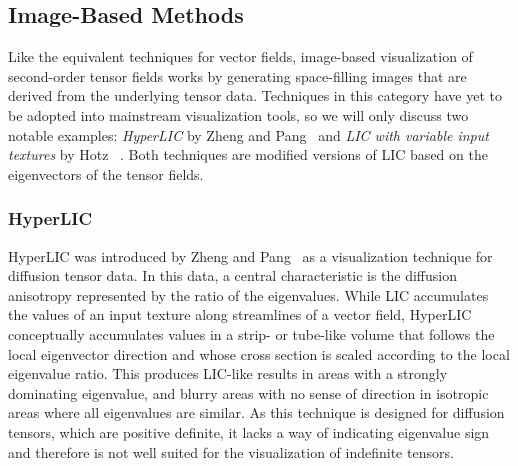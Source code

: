 \subsection{Image-Based Methods} %
\label{sub:tensor_image_based}
%
Like the equivalent techniques for vector fields, image-based visualization of
second-order tensor fields works by generating space-filling images that are
derived from the underlying tensor data.
%
Techniques in this category have yet to be adopted into mainstream visualization
tools, so we will only discuss two notable examples: \emph{HyperLIC} by Zheng
and Pang~\cite{Zheng2003} and \emph{LIC with variable input textures} by Hotz
\etal~\cite{Hotz2004}.
%
Both techniques are modified versions of \ac{LIC} based on the eigenvectors of
the tensor fields.
%

\subsubsection{HyperLIC} %
%
HyperLIC was introduced by Zheng and Pang~\cite{Zheng2003} as a visualization
technique for diffusion tensor data.
%
In this data, a central characteristic is the diffusion anisotropy represented
by the ratio of the eigenvalues.
%
While \ac{LIC} accumulates the values of an input texture along streamlines of a
vector field, HyperLIC conceptually accumulates values in a strip- or tube-like
volume that follows the local eigenvector direction and whose cross section is
scaled according to the local eigenvalue ratio.
%
This produces \ac{LIC}-like results in areas with a strongly dominating
eigenvalue, and blurry areas with no sense of direction in isotropic areas where
all eigenvalues are similar.
%
As this technique is designed for diffusion tensors, which are positive
definite, it lacks a way of indicating eigenvalue sign and therefore is not well
suited for the visualization of indefinite tensors.
%

